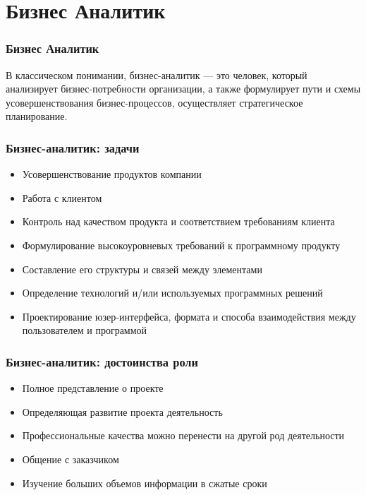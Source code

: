 \documentclass{../industrial-development}
\begin{document}
	\section{Бизнес Аналитик}
	
	\begin{frame} \frametitle{Бизнес Аналитик}
		\begin{block}{}
			\alert {}В классическом понимании, {бизнес-аналитик} — это человек, который анализирует бизнес-потребности организации, а также формулирует пути и схемы усовершенствования бизнес-процессов, осуществляет стратегическое планирование. 
		\end{block}
		
	\end{frame}
	
	\begin{frame} \frametitle{Бизнес-аналитик: задачи}
		\begin{itemize}
			\item Усовершенствование продуктов компании
			\item Работа с клиентом
			\item Контроль над качеством продукта и соответствием требованиям клиента
			\item Формулирование высокоуровневых требований к программному продукту
			\item Составление его структуры и связей между элементами
			\item Определение технологий и/или используемых программных решений
			\item Проектирование юзер-интерфейса, формата и способа взаимодействия между пользователем и программой
		\end{itemize}
	\end{frame}
	
	\begin{frame} \frametitle{Бизнес-аналитик: достоинства роли}
		\begin{itemize}
			\item Полное представление о проекте
			\item Определяющая развитие проекта деятельность
			\item Профессиональные качества можно перенести на другой род деятельности
			\item Общение с заказчиком
			\item Изучение больших объемов информации в сжатые сроки
		\end{itemize}
	\end{frame}
	
\end{document}
